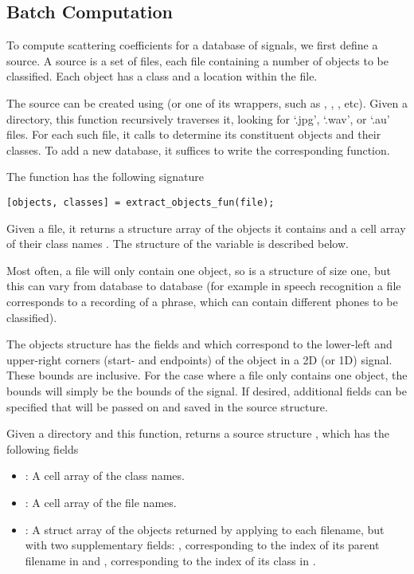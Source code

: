 \documentclass{article}
\begin{document}
\subsection{Batch Computation \label{sec:batch-computation}}

To compute scattering coefficients for a database of signals, we first define a source. A source is a set of files, each file containing a number of objects to be classified. Each object has a class and a location within the file.

The source can be created using  (or one of its wrappers, such as , , , etc). Given a directory, this function recursively traverses it, looking for `.jpg', `.wav', or `.au' files. For each such file, it calls  to determine its constituent objects and their classes. To add a new database, it suffices to write the corresponding  function.

The  function has the following signature
\begin{lstlisting}
[objects, classes] = extract_objects_fun(file);
\end{lstlisting}
Given a file, it returns a structure array  of the objects it contains and a cell array of their class names . The structure of the  variable is described below.

Most often, a file will only contain one object, so  is a  structure of size one, but this can vary from database to database (for example in speech recognition a file corresponds to a recording of a phrase, which can contain different phones to be classified).

The objects structure has the fields  and  which correspond to the lower-left and upper-right corners (start- and endpoints) of the object in a 2D (or 1D) signal. These bounds are inclusive. For the case where a file only contains one object, the bounds will simply be the bounds of the signal. If desired, additional fields can be specified that will be passed on and saved in the source structure.

Given a directory and this function,  returns a source structure , which has the following fields
\begin{itemize}
	\item {}: A cell array of the class names.
	\item {}: A cell array of the file names.
	\item {}: A struct array of the objects returned by applying  to each filename, but with two supplementary fields: , corresponding to the index of its parent filename in  and , corresponding to the index of its class in .
\end{itemize}
\end{document}
